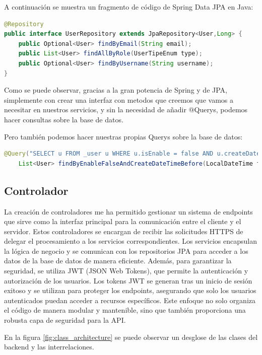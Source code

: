 A continuación se muestra un fragmento de código de Spring Data JPA en Java:
\myjavastyle
\begin{lstlisting}[language=Java, caption=Ejemplo de Repositorio en Spring Data JPA, label=lst:jpacodigo]
@Repository
public interface UserRepository extends JpaRepository<User,Long> {
    public Optional<User> findByEmail(String email);
    public List<User> findAllByRole(UserTipeEnum type);
    public Optional<User> findByUsername(String username);
}
\end{lstlisting}

Como se puede observar, gracias a la gran potencia de Spring y de JPA, simplemente con crear una interfaz con metodos que creemos que vamos a necesitar en 
nuestros servicios, y sin la necesidad de añadir @Querys, podemos hacer consultas sobre la base de datos.

Pero también podemos hacer nuestras propias Querys sobre la base de datos:
\myjavastyle
\begin{lstlisting}[language=Java, caption=Ejemplo de Query  en Spring Data JPA]
    @Query("SELECT u FROM _user u WHERE u.isEnable = false AND u.createDateTime < :fifteenMinutesAgo")
    List<User> findByEnableFalseAndCreateDateTimeBefore(LocalDateTime fifteenMinutesAgo);
\end{lstlisting}

\subsection{Controlador}
La creación de controladores me ha permitido gestionar un sistema de endpoints que sirve como la interfaz principal 
para la comunicación entre el cliente y el servidor. Estos controladores se encargan de recibir las solicitudes HTTPS de delegar el procesamiento a 
los servicios correspondientes. Los servicios encapsulan la lógica de negocio y se comunican con los repositorios JPA para acceder a los datos de la 
base de datos de manera eficiente. Además, para garantizar la seguridad, se utiliza JWT (JSON Web Tokens), que permite la autenticación y autorización 
de los usuarios. Los tokens JWT se generan tras un inicio de sesión exitoso y se utilizan para proteger los endpoints, asegurando que solo los usuarios 
autenticados puedan acceder a recursos específicos. Este enfoque no solo organiza el código de manera modular y mantenible, sino que también proporciona 
una robusta capa de seguridad para la API.

En la figura \ref{fig:class_architecture} se puede observar un desglose de las clases del backend y las interrelaciones.

